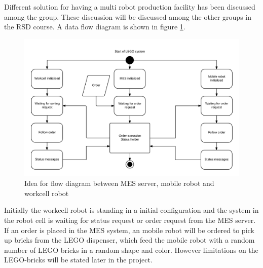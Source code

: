Different solution for having a multi robot production facility has been discussed among the group. These discussion will be discussed among the other groups in the RSD course. A data flow diagram is shown in figure \ref{fig:ideasForImplementation}. 

\begin{figure}[ht]
\centering
\includegraphics[width=\textwidth]{images/ideasForImplementation.png}
\caption{Idea for flow diagram between MES server, mobile robot and workcell robot}
\label{fig:ideasForImplementation}
\end{figure}

Initially the workcell robot is standing in a initial configuration and the system in the robot cell is waiting for status request or order request from the MES server. If an order is placed in the MES system, an mobile robot will be ordered to pick up bricks from the LEGO dispenser, which feed the mobile robot with a random number of LEGO bricks in a random shape and color. However limitations on the LEGO-bricks will be stated later in the project. 

